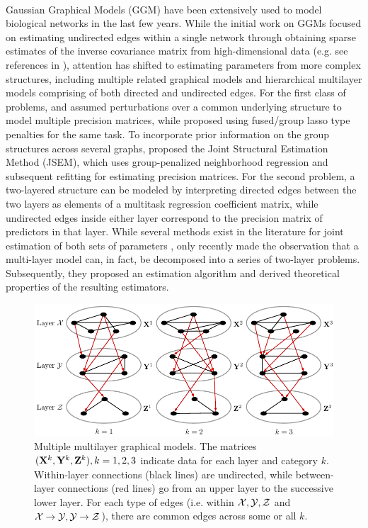 \paragraph{}
Gaussian Graphical Models (GGM) have been extensively used to model biological networks in the last few years. While the initial work on GGMs focused on estimating undirected edges within a single network through obtaining sparse estimates of the inverse covariance matrix from high-dimensional data (e.g. see references in \citet{BuhlmannvandeGeer11}), attention has shifted to estimating parameters from more complex structures, including multiple related graphical models and hierarchical multilayer models comprising of both directed and undirected edges. For the first class of problems, \citet{GuoEtal11} and \citet{XieLiuValdar16} assumed perturbations over a common underlying structure to model multiple precision matrices, while \citet{DanaherEtal14} proposed using fused/group lasso type penalties for the same task. To incorporate prior information on the group structures across several graphs, \citet{MaMichailidis15} proposed the Joint Structural Estimation Method (JSEM), which uses group-penalized neighborhood regression and subsequent refitting for estimating precision matrices.
For the second problem, a two-layered structure can be modeled by interpreting directed edges between the two layers as elements of a multitask regression coefficient matrix, while undirected edges inside either layer correspond to the precision matrix of predictors in that layer. While several methods exist in the literature for joint estimation of both sets of parameters \citep{LeeLiu12, CaiEtal12}, only recently \citet{LinEtal16} made the observation that a multi-layer model can, in fact, be decomposed into a series of two-layer problems. Subsequently, they proposed an estimation algorithm and derived theoretical properties of the resulting estimators.

\begin{figure}
\centering
\includegraphics[]{multi2layer}
\caption{Multiple multilayer graphical models. The matrices $({\mathbf{X}}^k, {\mathbf{Y}}^k, {\mathbf{Z}}^k), k = 1,2,3$ indicate data for each layer and category $k$. Within-layer connections (black lines) are undirected, while between-layer connections (red lines) go from an upper layer to the successive lower layer. For each type of edges (i.e. within ${\cal{X}}, {\cal{Y}}, {\cal{Z}}$ and ${\cal{X}} \rightarrow {\cal{Y}}, {\cal{Y}} \rightarrow {\cal{Z}}$), there are common edges across some or all $k$. }
\label{fig:multi2layer}
\end{figure}

